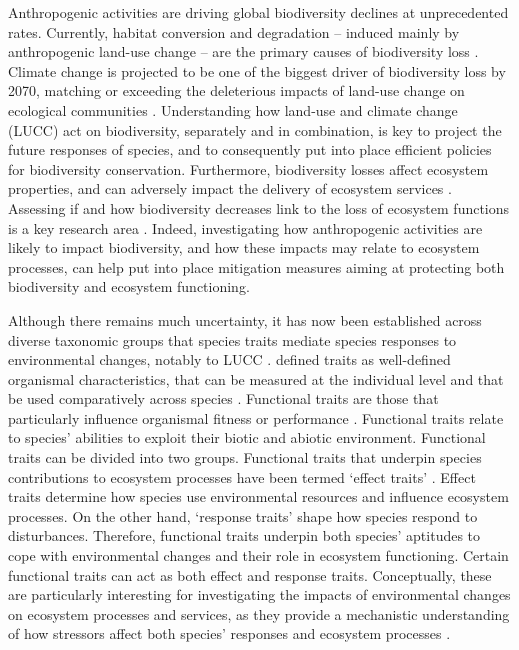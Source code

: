 Anthropogenic activities are driving global biodiversity declines at unprecedented rates. Currently, habitat conversion and degradation – induced mainly by anthropogenic land-use change –  are the primary causes of biodiversity loss \citep{Pereira2012, Newbold2015}. Climate change is projected to be one of the biggest driver of biodiversity loss by 2070, matching or exceeding the deleterious impacts of land-use change on ecological communities \citep{Newbold2018}. Understanding how land-use and climate change (LUCC) act on biodiversity, separately and in combination, is key to project the future responses of species, and to consequently put into place efficient policies for biodiversity conservation. Furthermore, biodiversity losses affect ecosystem properties, and can adversely impact the delivery of ecosystem services \citep{Hooper2012, Oliver2015,MEA2005}. Assessing if and how biodiversity decreases link to the loss of ecosystem functions is a key research area \citep{Petchey2006a, Lefcheck2015}. Indeed, investigating how anthropogenic activities are likely to impact biodiversity, and how these impacts may relate to ecosystem processes, can help put into place mitigation measures aiming at protecting both biodiversity and ecosystem functioning.

Although there remains much uncertainty, it has now been established across diverse taxonomic groups that species traits mediate species responses to environmental changes, notably to LUCC \citep{Newbold2013, Pearson2014,Pacifici2017,Estrada2018, Angert2011}.
\citet{McGill2006} defined traits as well-defined organismal characteristics, that can be measured at the individual level and that be used comparatively across species . Functional traits are those that particularly influence organismal fitness or performance \citep{Violle2007}. Functional traits relate to species’ abilities to exploit their biotic and abiotic environment. Functional traits can be divided into two groups. Functional traits that underpin species contributions to ecosystem processes have been termed ‘effect traits’ \citep{Lavorel2002, Wong2018}.  Effect traits determine how species use environmental resources and influence ecosystem processes. On the other hand, `response traits’ shape how species respond to disturbances. Therefore, functional traits underpin both species’ aptitudes to cope with environmental changes and their role in ecosystem functioning.  Certain functional traits can act as both effect and response traits. Conceptually, these are particularly interesting for investigating the impacts of environmental changes on ecosystem processes and services, as they provide a mechanistic understanding of how stressors affect both species’ responses and ecosystem processes \citep{Lavorel2002, Luck2012, Hevia2017}.
  
